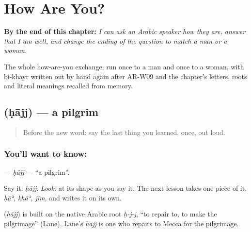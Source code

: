 
\chapter{How Are You?}
\label{ch:ar-how-are-you}

\begin{chapteropening}
\textbf{By the end of this chapter:} \emph{I can ask an Arabic speaker how they are, answer that I am well, and change the ending of the question to match a man or a woman.}

The whole how-are-you exchange, run once to a man and once to a woman, with bi-khayr written out by hand again after AR-W09 and the chapter's letters, roots and literal meanings recalled from memory.
\end{chapteropening}

\section[\texorpdfstring{\ar{حاج} (ḥājj)}{حاج (ḥājj)}]{ (ḥājj) — a pilgrim}

\label{lesson:AR-C03-haajj}



\begin{quote}
Before the new word: say the last thing you learned, once, out loud.
\end{quote}

\subsection*{You'll want to know: }
\textbf{} — \emph{ḥājj} — \textquotedblleft{}a pilgrim\textquotedblright{}.

Say it: \emph{ḥājj}. \emph{Look:} at its shape as you say it. The next lesson takes one piece of it, \emph{ḥāʾ, khāʾ, jīm}, and writes it on its own.

\begin{cousinweb}
\textbf{} (\emph{ḥājj}) is built on the native Arabic root \emph{ḥ-j-j}, \textquotedblleft{}to repair to, to make the pilgrimage\textquotedblright{} (Lane). Lane's \emph{ḥājj} is one who repairs to Mecca for the pilgrimage.
\end{cousinweb}

